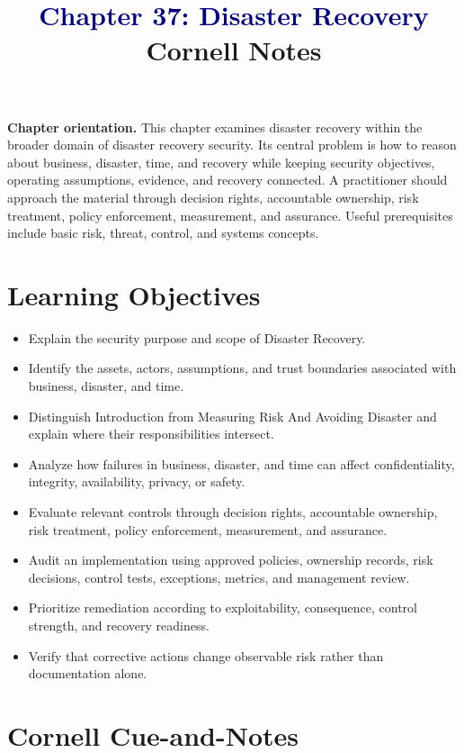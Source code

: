 \documentclass[11pt]{article}
\title{\textcolor{Navy}{Chapter 37: Disaster Recovery}\\[2mm]\large Cornell Notes}
\author{}
\date{}
\begin{document}
\maketitle
\thispagestyle{fancy}
\vspace{-1.5em}
\begin{orientationbox}
\textbf{Chapter orientation.} This chapter examines disaster recovery within the broader domain of disaster recovery security. Its central problem is how to reason about business, disaster, time, and recovery while keeping security objectives, operating assumptions, evidence, and recovery connected. A practitioner should approach the material through decision rights, accountable ownership, risk treatment, policy enforcement, measurement, and assurance. Useful prerequisites include basic risk, threat, control, and systems concepts.
\end{orientationbox}
\section*{Learning Objectives}
\begin{itemize}
\item Explain the security purpose and scope of Disaster Recovery.
\item Identify the assets, actors, assumptions, and trust boundaries associated with business, disaster, and time.
\item Distinguish Introduction from Measuring Risk And Avoiding Disaster and explain where their responsibilities intersect.
\item Analyze how failures in business, disaster, and time can affect confidentiality, integrity, availability, privacy, or safety.
\item Evaluate relevant controls through decision rights, accountable ownership, risk treatment, policy enforcement, measurement, and assurance.
\item Audit an implementation using approved policies, ownership records, risk decisions, control tests, exceptions, metrics, and management review.
\item Prioritize remediation according to exploitability, consequence, control strength, and recovery readiness.
\item Verify that corrective actions change observable risk rather than documentation alone.
\end{itemize}
\section*{Cornell Cue-and-Notes}
\end{document}
